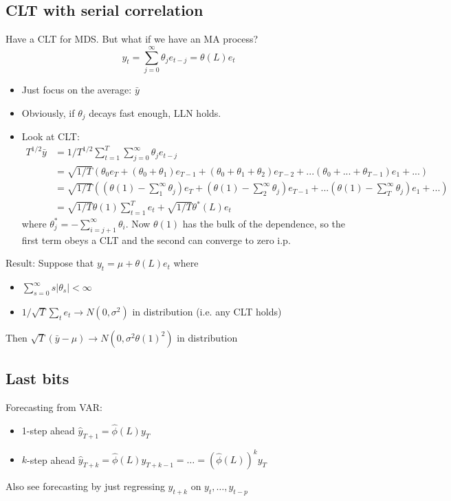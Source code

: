 \subsection{CLT with serial correlation}

Have a CLT for MDS. But what if we have an MA process?
\[y_t = \sum_{j=0}^\infty \theta_j e_{t-j} = \theta(L) e_t\]

\begin{itemize}
\item Just focus on the average: $\bar y$
\item Obviously, if $\theta_j$ decays fast enough, LLN holds.
\item Look at CLT:
  \begin{align*}
    T^{1/2} \bar y
    &= 1/T^{1/2} \sum_{t=1}^T \sum_{j=0}^\infty \theta_j e_{t-j} \\
    &= \sqrt{1/T} ( \theta_0 e_T +
    ( \theta_0 + \theta_1 ) e_{T-1} +
    ( \theta_0 + \theta_1 + \theta_2 )  e_{T-2} + ...
    ( \theta_0 + ... + \theta_{T-1} ) e_1 + ... ) \\
    &= \sqrt{1/T} ( ( \theta(1) - \sum_1^\infty \theta_j ) e_T +
    ( \theta(1) - \sum_2^\infty \theta_j ) e_{T-1} + ...
    ( \theta(1) - \sum_T^\infty \theta_j ) e_1 + ... ) \\
    &= \sqrt{1/T} \theta(1) \sum_{t=1}^T e_t + \sqrt{1/T} \theta^*(L) e_t
  \end{align*}
  where $\theta_j^* = - \sum_{i=j+1}^\infty \theta_i$.  Now $\theta(1)$ has the bulk of the
  dependence, so the first term obeys a CLT and the second can
  converge to zero i.p.
\end{itemize}

Result: Suppose that $y_t = \mu + \theta(L) e_t$ where
\begin{itemize}
\item $\sum_{s=0}^\infty s |\theta_s| < \infty$
\item $1/\sqrt{T} \sum_t e_t \to N(0, \sigma^2)$ in distribution (i.e. any CLT
  holds)
\end{itemize}
Then $\sqrt{T} (\bar y - \mu ) \to N( 0, \sigma^2 \theta(1)^2 )$ in distribution

\subsection{Last bits}

Forecasting from VAR:
\begin{itemize}
\item 1-step ahead $\hat y_{T+1} = \hat \phi(L) y_T$
\item $k$-step ahead $\hat y_{T+k} = \hat \phi(L) y_{T+k-1} = \dots = ( \hat
  \phi(L) )^k y_T$
\end{itemize}
Also see forecasting by just regressing $y_{t+k}$ on $y_t,\dots,y_{t-p}$

